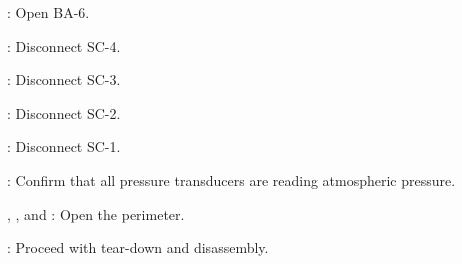 \begin{checklist}
    \item \primary{}: Open BA-6. 
    \item \primary{}: Disconnect SC-4.
    \item \primary{}: Disconnect SC-3.
    \item \primary{}: Disconnect SC-2.
    \item \primary{}: Disconnect SC-1.
    \item \daq{}: Confirm that all pressure transducers are reading atmospheric pressure.
    \item \peri{}, \perii{}, and \periii{}: Open the perimeter.
    \item \ops{}: Proceed with tear-down and disassembly.
\end{checklist}

\newpage
